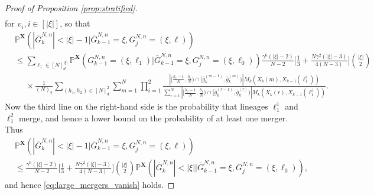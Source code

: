 \documentclass[10pt,a4paper]{amsart}
\newcommand{\bbP}{\mathbb{P}}
\newcommand{\bfX}{\mathbf{X}}
\begin{document}
\begin{proof}[Proof of Proposition \ref{prop:stratified}]
\begin{align*}
\end{align*}
for $v_i, i \in [ | \xi | ]$, so that
\begin{align*}
&\bbP^{ \bfX }( | \bar{ G }_k^{ N, n } | < | \xi | - 1 | \bar{ G }_{ k - 1 }^{ N, n } = \xi, G_j^{ N, n } = ( \xi, \ell ) ) \\
&\leq \sum_{ \ell_1 \in [ N ]_d^{ | \xi | } } \bbP^{ \bfX }( G_{ k - 1 }^{ N, n } = ( \xi, \ell_1 ) | \bar{ G }_{ k - 1 }^{ N, n } = \xi, G_j^{ N, n } = ( \xi, \ell_0 ) )  \frac{ \gamma^6 ( | \xi | - 2 ) }{ N - 2 } \Bigg[ \frac{ 1 }{ 3 } + \frac{ N \gamma^2 ( | \xi | - 3 ) }{ 4 ( N - 3 ) } \Bigg] \binom{ | \xi | }{ 2 } \\
&\phantom{\leq} \times \frac{ 1 }{ ( N )_2 } \sum_{ ( h_1, h_2 ) \in [ N ]_d^2 } \sum_{ m = 1 }^N \prod_{ i = 1 }^2 \frac{ | [ \frac{ h_i - 1 }{ N }, \frac{ h_i }{ N } ) \cap [ \bar{ g }_k^{ ( m - 1 ) }, \bar{ g }_k^{ ( m ) } ) | M_k( X_k( m ), X_{ k - 1 }( \ell_1^i ) ) }{ \sum_{ r = 1 }^N | [ \frac{ h_i - 1 }{ N }, \frac{ h_i }{ N } ) \cap [ \bar{ g }_k^{ ( r - 1 ) }, \bar{ g }_k^{ ( r ) } ) | M_k( X_k( r ), X_{ k - 1 }( \ell_1^i ) ) }.
\end{align*}
Now the third line on the right-hand side is the probability that lineages $\ell_1^1$ and $\ell_1^2$ merge, and hence a lower bound on the probability of at least one merger.
Thus
\begin{align*}
&\bbP^{ \bfX }( | \bar{ G }_k^{ N, n } | < | \xi | - 1 | \bar{ G }_{ k - 1 }^{ N, n } = \xi, G_j^{ N, n } = ( \xi, \ell ) ) \\
&\leq \frac{ \gamma^6 ( | \xi | - 2 ) }{ N - 2 } \Bigg[ \frac{ 1 }{ 3 } + \frac{ N \gamma^2 ( | \xi | - 3 ) }{ 4 ( N - 3 ) } \Bigg] \binom{ | \xi | }{ 2 } \bbP^{ \bfX }( | \bar{ G }_k^{ N, n } | < | \xi | | \bar{ G }_{ k - 1 }^{ N, n } = \xi, G_j^{ N, n } = ( \xi, \ell_0 ) ),
\end{align*}
and hence \eqref{eq:large_mergers_vanish} holds.


\end{proof}
\end{document}
